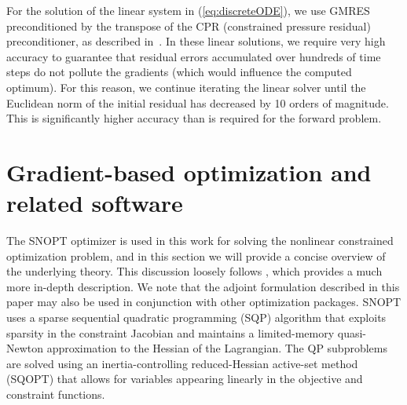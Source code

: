 \documentclass[twocolumn,numbook]{svjour3}          %
\def\u{{\vec u}}
\def\c{{\vec c}}
\def\x{{\vec x}}
\def\s{{\vec s}}
\def\g{{\vec{G}}}
\def\blambda{{\pmb{\lambda}}}%
\def\nthinsp{\mskip -2   mu}
\def\blambdahat{\skew1\widehat \blambda}
\def\blambdastar{\blambda\superstar}
\def\shat{\widehat \s}
\def\sstar{\s\superstar}
\def\superstar{^{\raise 0.5pt\hbox{$\nthinsp *$}}}
\def\xstar{\x\superstar}
\def\uhat{\skew{2.8}\widehat \u}
\def\ustar{\u\superstar}
\def\GQPk{GQP$_k$}
\def\SNOPT {{\small SNOPT}}
\def\SQOPT {{\small SQOPT}}
\begin{document}
For the solution of the linear system in (\ref{eq:discreteODE}), we use
GMRES preconditioned by the transpose of the CPR (constrained
pressure residual) preconditioner, as described in~\cite{CPRA}. In these
linear solutions, we require very high accuracy to guarantee that residual
errors accumulated over hundreds of time steps do not pollute the gradients
(which would influence the computed optimum). For this reason, we continue
iterating the linear solver until the Euclidean norm of the initial residual has
decreased by 10 orders of magnitude. This is significantly higher accuracy than
is required for the forward problem.




\section{Gradient-based optimization and related software}
\label{sec:SQPSNOPT}

The \SNOPT{} optimizer is used in this work for solving the nonlinear constrained
optimization problem, and in this section we will provide a concise overview of the underlying theory. This discussion loosely follows \cite{SNOPT}, which provides a much more in-depth description. We note that the adjoint formulation described in this paper may also be used in conjunction with other optimization packages. \SNOPT{} uses a sparse sequential quadratic
programming (SQP) algorithm that exploits sparsity in
the constraint Jacobian and maintains a limited-memory quasi-Newton
approximation to the Hessian of the Lagrangian. The QP
subproblems are solved using an inertia-controlling reduced-Hessian
active-set method (\SQOPT) that allows for variables appearing
linearly in the objective and constraint functions. 
 



%
\end{document}
